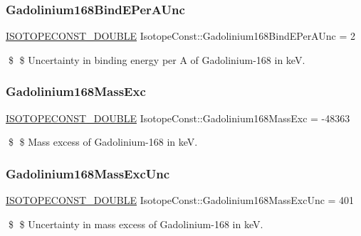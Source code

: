 \subsubsection{\texorpdfstring{Gadolinium168\+Bind\+E\+Per\+A\+Unc}{Gadolinium168BindEPerAUnc}}
{\footnotesize\ttfamily \mbox{\hyperlink{group___isotope_const-_macros_ga8f45a7272ce02c0b4c65c44636ed719a}{I\+S\+O\+T\+O\+P\+E\+C\+O\+N\+S\+T\+\_\+\+D\+O\+U\+B\+LE}} Isotope\+Const\+::\+Gadolinium168\+Bind\+E\+Per\+A\+Unc = 2}

\$ \$ Uncertainty in binding energy per A of Gadolinium-\/168 in keV. \mbox{\label{group___isotope_const-_gadolinium-_gd168_ga9670a9bccdcf30813c069f7c4593708f}} 
\subsubsection{\texorpdfstring{Gadolinium168\+Mass\+Exc}{Gadolinium168MassExc}}
{\footnotesize\ttfamily \mbox{\hyperlink{group___isotope_const-_macros_ga8f45a7272ce02c0b4c65c44636ed719a}{I\+S\+O\+T\+O\+P\+E\+C\+O\+N\+S\+T\+\_\+\+D\+O\+U\+B\+LE}} Isotope\+Const\+::\+Gadolinium168\+Mass\+Exc = -\/48363}

\$ \$ Mass excess of Gadolinium-\/168 in keV. \mbox{\label{group___isotope_const-_gadolinium-_gd168_ga4d007e40e82e050012799a2efdf46c3d}} 
\subsubsection{\texorpdfstring{Gadolinium168\+Mass\+Exc\+Unc}{Gadolinium168MassExcUnc}}
{\footnotesize\ttfamily \mbox{\hyperlink{group___isotope_const-_macros_ga8f45a7272ce02c0b4c65c44636ed719a}{I\+S\+O\+T\+O\+P\+E\+C\+O\+N\+S\+T\+\_\+\+D\+O\+U\+B\+LE}} Isotope\+Const\+::\+Gadolinium168\+Mass\+Exc\+Unc = 401}

\$ \$ Uncertainty in mass excess of Gadolinium-\/168 in keV. \mbox{\label{group___isotope_const-_gadolinium-_gd168_ga9f67b476d384b4baa3398cb4aadd8dee}} 

